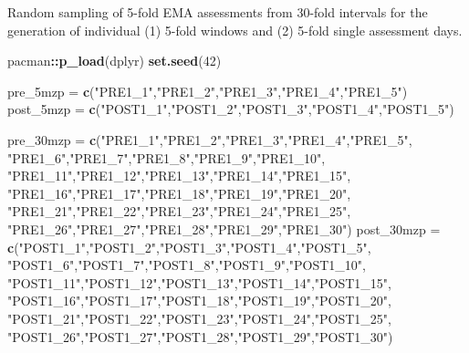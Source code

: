 \documentclass[12pt,twoside]{reedthesis}
\newenvironment{Shaded}{\begin{snugshade}}{\end{snugshade}}
\newcommand{\DecValTok}[1]{\textcolor[rgb]{0.00,0.00,0.81}{#1}}
\newcommand{\KeywordTok}[1]{\textcolor[rgb]{0.13,0.29,0.53}{\textbf{#1}}}
\newcommand{\NormalTok}[1]{#1}
\newcommand{\OperatorTok}[1]{\textcolor[rgb]{0.81,0.36,0.00}{\textbf{#1}}}
\newcommand{\StringTok}[1]{\textcolor[rgb]{0.31,0.60,0.02}{#1}}
\begin{document}
Random sampling of 5-fold EMA assessments from 30-fold intervals for the generation of individual (1) 5-fold windows and (2) 5-fold single assessment days.
\begin{Shaded}
\begin{Highlighting}[]
\NormalTok{pacman}\OperatorTok{::}\KeywordTok{p_load}\NormalTok{(dplyr)}
\KeywordTok{set.seed}\NormalTok{(}\DecValTok{42}\NormalTok{)}

\NormalTok{pre_5mzp =}\StringTok{ }\KeywordTok{c}\NormalTok{(}\StringTok{"PRE1_1"}\NormalTok{,}\StringTok{"PRE1_2"}\NormalTok{,}\StringTok{"PRE1_3"}\NormalTok{,}\StringTok{"PRE1_4"}\NormalTok{,}\StringTok{"PRE1_5"}\NormalTok{)}
\NormalTok{post_5mzp =}\StringTok{ }\KeywordTok{c}\NormalTok{(}\StringTok{"POST1_1"}\NormalTok{,}\StringTok{"POST1_2"}\NormalTok{,}\StringTok{"POST1_3"}\NormalTok{,}\StringTok{"POST1_4"}\NormalTok{,}\StringTok{"POST1_5"}\NormalTok{)}

\NormalTok{pre_30mzp =}\StringTok{ }\KeywordTok{c}\NormalTok{(}\StringTok{"PRE1_1"}\NormalTok{,}\StringTok{"PRE1_2"}\NormalTok{,}\StringTok{"PRE1_3"}\NormalTok{,}\StringTok{"PRE1_4"}\NormalTok{,}\StringTok{"PRE1_5"}\NormalTok{,}
            \StringTok{"PRE1_6"}\NormalTok{,}\StringTok{"PRE1_7"}\NormalTok{,}\StringTok{"PRE1_8"}\NormalTok{,}\StringTok{"PRE1_9"}\NormalTok{,}\StringTok{"PRE1_10"}\NormalTok{,}
            \StringTok{"PRE1_11"}\NormalTok{,}\StringTok{"PRE1_12"}\NormalTok{,}\StringTok{"PRE1_13"}\NormalTok{,}\StringTok{"PRE1_14"}\NormalTok{,}\StringTok{"PRE1_15"}\NormalTok{,}
            \StringTok{"PRE1_16"}\NormalTok{,}\StringTok{"PRE1_17"}\NormalTok{,}\StringTok{"PRE1_18"}\NormalTok{,}\StringTok{"PRE1_19"}\NormalTok{,}\StringTok{"PRE1_20"}\NormalTok{,}
            \StringTok{"PRE1_21"}\NormalTok{,}\StringTok{"PRE1_22"}\NormalTok{,}\StringTok{"PRE1_23"}\NormalTok{,}\StringTok{"PRE1_24"}\NormalTok{,}\StringTok{"PRE1_25"}\NormalTok{,}
            \StringTok{"PRE1_26"}\NormalTok{,}\StringTok{"PRE1_27"}\NormalTok{,}\StringTok{"PRE1_28"}\NormalTok{,}\StringTok{"PRE1_29"}\NormalTok{,}\StringTok{"PRE1_30"}\NormalTok{)}
\NormalTok{post_30mzp =}\StringTok{ }\KeywordTok{c}\NormalTok{(}\StringTok{"POST1_1"}\NormalTok{,}\StringTok{"POST1_2"}\NormalTok{,}\StringTok{"POST1_3"}\NormalTok{,}\StringTok{"POST1_4"}\NormalTok{,}\StringTok{"POST1_5"}\NormalTok{,}
             \StringTok{"POST1_6"}\NormalTok{,}\StringTok{"POST1_7"}\NormalTok{,}\StringTok{"POST1_8"}\NormalTok{,}\StringTok{"POST1_9"}\NormalTok{,}\StringTok{"POST1_10"}\NormalTok{,}
             \StringTok{"POST1_11"}\NormalTok{,}\StringTok{"POST1_12"}\NormalTok{,}\StringTok{"POST1_13"}\NormalTok{,}\StringTok{"POST1_14"}\NormalTok{,}\StringTok{"POST1_15"}\NormalTok{,}
             \StringTok{"POST1_16"}\NormalTok{,}\StringTok{"POST1_17"}\NormalTok{,}\StringTok{"POST1_18"}\NormalTok{,}\StringTok{"POST1_19"}\NormalTok{,}\StringTok{"POST1_20"}\NormalTok{,}
             \StringTok{"POST1_21"}\NormalTok{,}\StringTok{"POST1_22"}\NormalTok{,}\StringTok{"POST1_23"}\NormalTok{,}\StringTok{"POST1_24"}\NormalTok{,}\StringTok{"POST1_25"}\NormalTok{,}
             \StringTok{"POST1_26"}\NormalTok{,}\StringTok{"POST1_27"}\NormalTok{,}\StringTok{"POST1_28"}\NormalTok{,}\StringTok{"POST1_29"}\NormalTok{,}\StringTok{"POST1_30"}\NormalTok{)}


\end{Highlighting}
\end{Shaded}
\end{document}
